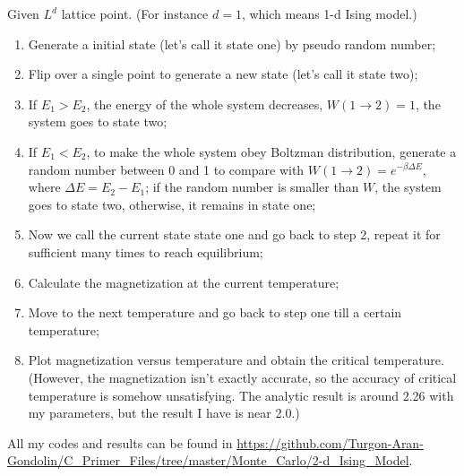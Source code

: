 \documentclass{article}
\begin{document}
Given $L^d$ lattice point. (For instance $d=1$, which means 1-d Ising model.)
\begin{enumerate}[(1)]
	\item Generate a initial state (let's call it state one) by pseudo random number;
	\item Flip over a single point to generate a new state (let's call it state two);
	\item If $E_1>E_2$, the energy of the whole system decreases, $W(1\rightarrow2)=1$, the system goes to state two;
	\item If $E_1<E_2$, to make the whole system obey Boltzman distribution, generate a random number between 0 and 1 to compare with $W(1\rightarrow2)=e^{-\beta\Delta E}$, where $\Delta E=E_2-E_1$; if the random number is smaller than $W$, the system goes to state two, otherwise, it remains in state one;
	\item Now we call the current state state one and go back to step 2, repeat it for sufficient many times to reach equilibrium;
	\item Calculate the magnetization at the current temperature;
	\item Move to the next temperature and go back to step one till a certain temperature;
	\item Plot magnetization versus temperature and obtain the critical temperature. (However, the magnetization isn't exactly accurate, so the accuracy of critical temperature is somehow unsatisfying. The analytic result is around 2.26 with my parameters, but the result I have is near 2.0.)
\end{enumerate}

All my codes and results can be found in \url{https://github.com/Turgon-Aran-Gondolin/C_Primer_Files/tree/master/Monte_Carlo/2-d_Ising_Model}.

\end{document}
